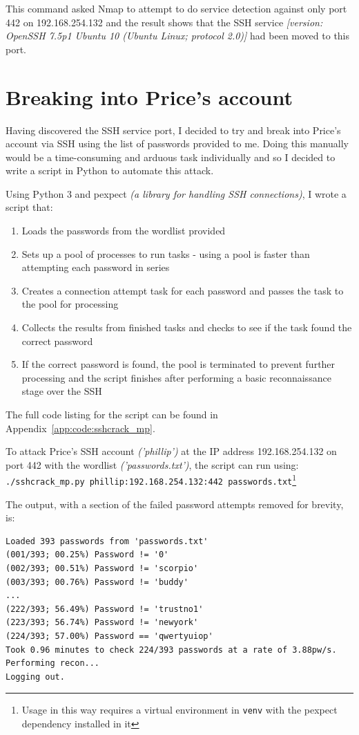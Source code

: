 \documentclass[12pt]{report}
\newcommand{\term}[1]{\colorbox{light-gray}{\texttt{#1}}}
\begin{document}
This command asked Nmap to attempt to do service detection against only port 442 on 192.168.254.132 and the result shows that the SSH service \textit{[version: OpenSSH 7.5p1 Ubuntu 10 (Ubuntu Linux; protocol 2.0)]} had been moved to this port.


\section{Breaking into Price's account}
Having discovered the SSH service port, I decided to try and break into Price's account via SSH using the list of passwords provided to me. Doing this manually would be a time-consuming and arduous task individually and so I decided to write a script in Python to automate this attack.

Using Python 3 and pexpect \textit{(a library for handling SSH connections)}, I wrote a script that:
\begin{enumerate}
  \item Loads the passwords from the wordlist provided
  \item Sets up a pool of processes to run tasks - using a pool is faster than attempting each password in series
  \item Creates a connection attempt task for each password and passes the task to the pool for processing
  \item Collects the results from finished tasks and checks to see if the task found the correct password
  \item If the correct password is found, the pool is terminated to prevent further processing and the script finishes after performing a basic reconnaissance stage over the SSH
\end{enumerate}

The full code listing for the script can be found in Appendix~\ref{app:code:sshcrack_mp}.

To attack Price's SSH account \textit{('phillip')} at the IP address 192.168.254.132 on port 442 with the wordlist \textit{('passwords.txt')}, the script can run using:\\
\term{./sshcrack\_mp.py phillip:192.168.254.132:442 passwords.txt}\footnote{Usage in this way requires a virtual environment in \texttt{venv} with the pexpect dependency installed in it}

The output, with a section of the failed password attempts removed for brevity, is:
\begin{Verbatim}[frame=leftline]
Loaded 393 passwords from 'passwords.txt'
(001/393; 00.25%) Password != '0'
(002/393; 00.51%) Password != 'scorpio'
(003/393; 00.76%) Password != 'buddy'
...
(222/393; 56.49%) Password != 'trustno1'
(223/393; 56.74%) Password != 'newyork'
(224/393; 57.00%) Password == 'qwertyuiop'
Took 0.96 minutes to check 224/393 passwords at a rate of 3.88pw/s.
Performing recon...
Logging out.
\end{Verbatim}
\end{document}

